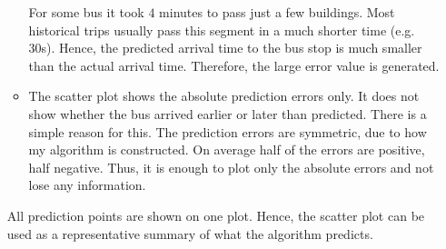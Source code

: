 \documentclass[12pt,a4paper,oneside,openright]{report}
\begin{document}
\begin{itemize}
\begin{itemize}
    For some bus it took $4$ minutes to pass just a few buildings. Most
    historical trips usually pass this segment in a much shorter
    time (e.g. 30s). Hence, the predicted arrival time to the bus stop is
    much smaller than the actual arrival time. Therefore, the large error value 
    is generated.

    \item
    The scatter plot shows the absolute prediction errors only. It does not show whether
    the bus arrived earlier or later than predicted. There is a simple reason for
    this. The prediction errors are symmetric, due to how my algorithm is constructed.
    On average half of the errors are positive, half negative. Thus, it is
    enough to plot only the absolute errors and not lose any information.

\end{itemize}

All prediction points are shown on one plot. Hence, the scatter plot can be
used as a representative summary of what the algorithm predicts.


\end{itemize}
\end{document}
